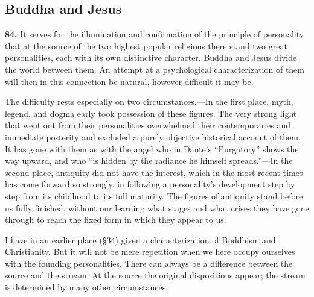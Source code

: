 \documentclass[12pt,a4paper]{book}
\newcommand{\opage}[1]{\marginnote{\footnotesize\textit{[#1]}}}
\begin{document}

\subsection{Buddha and Jesus}
\label{ssec:buddha-jesus}

\noindent\textbf{84.} It serves for the illumination and confirmation of the principle of
personality that at the source of the two highest popular religions there stand two great
personalities, each with its own distinctive character. Buddha and Jesus divide the world between
them. An attempt at a psychological 
\opage{194}characterization of them will then in this connection be
natural, however difficult it may be.

The difficulty rests especially on two circumstances.---In the first place, myth, legend, and dogma
early took possession of these figures. The very strong light that went out from their
personalities overwhelmed their contemporaries and immediate posterity and excluded a purely
objective historical account of them. It has gone with them as with the angel who in Dante's
``Purgatory'' shows the way upward, and who ``is hidden by the radiance he himself spreads.''---In
the second place, antiquity did not have the interest, which in the most recent times has come
forward so strongly, in following a personality's development step by step from its childhood to
its full maturity. The figures of antiquity stand before us fully finished, without our learning
what stages and what crises they have gone through to reach the fixed form in which they appear to
us.

I have in an earlier place (§34) given a characterization of Buddhism and Christianity. But it will
not be mere repetition when we here occupy ourselves with the founding personalities. There can
always be a difference between the source and the stream. At the source the original dispositions
appear; the stream is determined by many other circumstances.

\medskip
\end{document}
